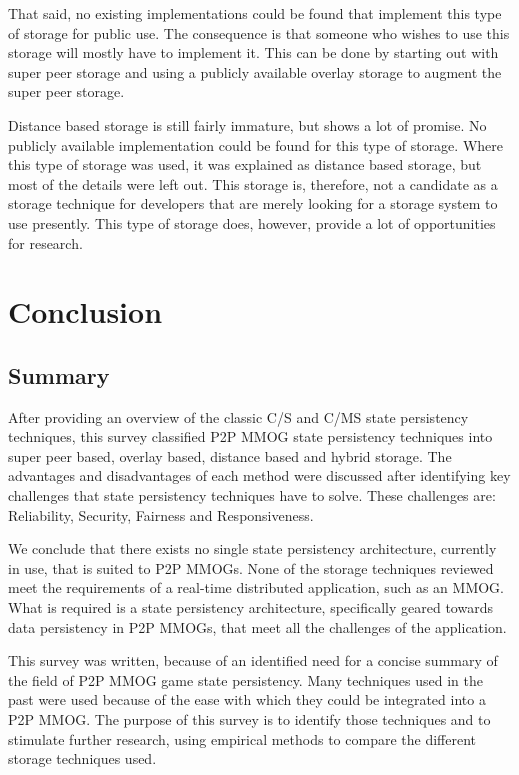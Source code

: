 That said, no existing implementations could be found that implement this type of storage for public use. The consequence is that someone who wishes
to use this storage will mostly have to implement it. This can be done by starting out with super peer storage and using a publicly available overlay
storage to augment the super peer storage.

Distance based storage is still fairly immature, but shows a lot of promise. No publicly available implementation could be found for this type of
storage. Where this type of storage was used, it was explained as distance based storage, but most of the details were left out. This storage is,
therefore, not a candidate as a storage technique for developers that are merely looking for a storage system to use presently. This type of storage
does, however, provide a lot of opportunities for research.

\section{Conclusion}
\label{conclusion}

\subsection{Summary}
After providing an overview of the classic C/S and C/MS state persistency techniques, this survey classified P2P MMOG state persistency techniques
into super peer based, overlay based, distance based and hybrid storage. The advantages and disadvantages of each method were discussed after
identifying key challenges that state persistency techniques have to solve. These challenges are: Reliability, Security, Fairness and Responsiveness.

We conclude that there exists no single state persistency architecture, currently in use, that is suited to P2P MMOGs. None of the storage techniques
reviewed meet the requirements of a real-time distributed application, such as an MMOG. What is required is a state persistency architecture,
specifically geared towards data persistency in P2P MMOGs, that meet all the challenges of the application.

This survey was written, because of an identified need for a concise summary of the field of P2P MMOG game state persistency. Many techniques used in
the past were used because of the ease with which they could be integrated into a P2P MMOG. The purpose of this survey is to identify those
techniques and to stimulate further research, using empirical methods to compare the different storage techniques used.

